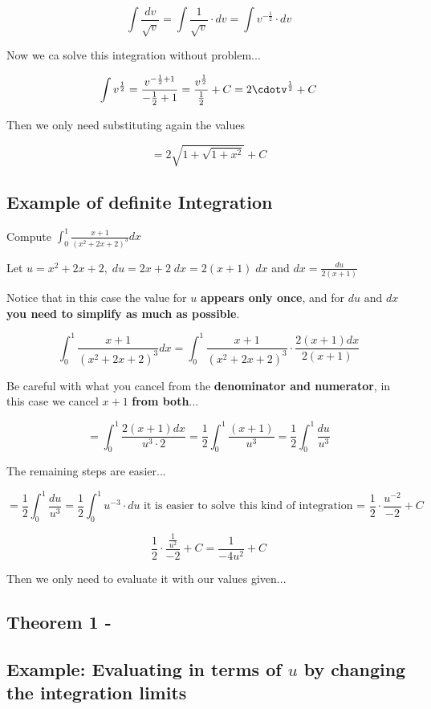 \documentclass{article}
\begin{document}
\[\int \frac{dv}{\sqrt{v}} = \int \frac{1}{\sqrt{v}} \cdot dv = \int v^{-\frac{1}{2}} \cdot dv\]

Now we ca solve this integration without problem...

\[\int v^{\frac{1}{2}} = \frac{v^{-\frac{1}{2} + 1}}{-\frac{1}{2}+1} = \frac{v^{\frac{1}{2}}}{\frac{1}{2}} + C = 2\cdotv^{\frac{1}{2}} + C
\]

Then we only need substituting again the values

\[=2\sqrt{1+\sqrt{1+x^2}} + C\]

\subsection*{Example \textbf{of definite Integration}}
Compute \(\int_{0}^{1} \frac{x+1}{(x^2+2x+2)^3} dx\)

Let \(u = x^2+2x+2,\;du=2x+2\;dx = 2(x+1)\;dx\) and \(dx=\frac{du}{2(x+1)}\) 

Notice that in this case the value for \(u\) \textbf{appears only once}, and for \(du \text{ and } dx\) \textbf{you need to simplify as much as possible}.

\[
\int_{0}^{1} \frac{x+1}{(x^2+2x+2)^3} dx = \int_{0}^{1}\frac{x+1}{(x^2+2x+2)^3} \cdot \frac{2(x+1)dx}{2(x+1)}
\]

Be careful with what you cancel from the \textbf{denominator and numerator}, in this case we cancel \(x+1\) \textbf{from both}...

\[
= \int_{0}^{1} \frac{2(x+1)dx}{u^3\cdot 2} = \frac{1}{2} \int_{0}^{1} \frac{(x+1)}{u^3} = \frac{1}{2} \int_{0}^{1} \frac{du}{u^3}
\]

The remaining steps are easier...

\[= \frac{1}{2} \int_{0}^{1} \frac{du}{u^3} = \frac{1}{2} \int_{0}^{1} u^{-3} \cdot du \text{ it is easier to solve this kind of integration =  }\frac{1}{2}\cdot \frac{u^{-2}}{-2} + C
\]

\[
\frac{1}{2} \cdot \frac{\frac{1}{u^2}}{-2} + C = \frac{1}{-4u^2} +C
\]

Then we only need to evaluate it with our values given...

\subsection*{Theorem 1 - }

\subsection*{Example: Evaluating in terms of \(u\) by changing the integration limits}
\end{document}
